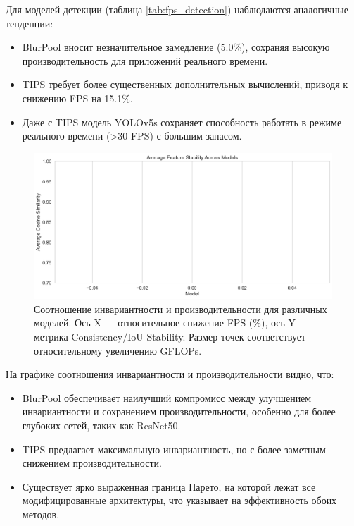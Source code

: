 Для моделей детекции (таблица \ref{tab:fps_detection}) наблюдаются аналогичные тенденции:
\begin{itemize}
    \item BlurPool вносит незначительное замедление (5.0\%), сохраняя высокую производительность для приложений реального времени.
    \item TIPS требует более существенных дополнительных вычислений, приводя к снижению FPS на 15.1\%.
    \item Даже с TIPS модель YOLOv5s сохраняет способность работать в режиме реального времени (>30 FPS) с большим запасом.
\end{itemize}

\begin{figure}[ht]
\centering
\includegraphics[width=\textwidth]{images/comparison/model_comparison_cosine_similarity.png}
\caption{Соотношение инвариантности и производительности для различных моделей. Ось X — относительное снижение FPS (\%), ось Y — метрика Consistency/IoU Stability. Размер точек соответствует относительному увеличению GFLOPs.}
\label{fig:performance_tradeoff}
\end{figure}

На графике соотношения инвариантности и производительности видно, что:
\begin{itemize}
    \item BlurPool обеспечивает наилучший компромисс между улучшением инвариантности и сохранением производительности, особенно для более глубоких сетей, таких как ResNet50.
    \item TIPS предлагает максимальную инвариантность, но с более заметным снижением производительности.
    \item Существует ярко выраженная граница Парето, на которой лежат все модифицированные архитектуры, что указывает на эффективность обоих методов.
\end{itemize}

